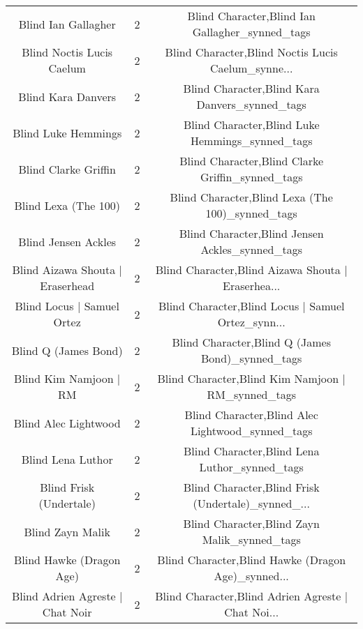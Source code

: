 \begin{table}[h!]
{\begin{tabular}{|c|c|c|}
                               Blind Ian Gallagher &          2 &    Blind Character,Blind Ian Gallagher\_synned\_tags \\
                         Blind Noctis Lucis Caelum &          2 & Blind Character,Blind Noctis Lucis Caelum\_synne... \\
                                Blind Kara Danvers &          2 &     Blind Character,Blind Kara Danvers\_synned\_tags \\
                               Blind Luke Hemmings &          2 &    Blind Character,Blind Luke Hemmings\_synned\_tags \\
                              Blind Clarke Griffin &          2 &   Blind Character,Blind Clarke Griffin\_synned\_tags \\
                              Blind Lexa (The 100) &          2 &   Blind Character,Blind Lexa (The 100)\_synned\_tags \\
                               Blind Jensen Ackles &          2 &    Blind Character,Blind Jensen Ackles\_synned\_tags \\
                  Blind Aizawa Shouta | Eraserhead &          2 & Blind Character,Blind Aizawa Shouta | Eraserhea... \\
                        Blind Locus | Samuel Ortez &          2 & Blind Character,Blind Locus | Samuel Ortez\_synn... \\
                              Blind Q (James Bond) &          2 &   Blind Character,Blind Q (James Bond)\_synned\_tags \\
                            Blind Kim Namjoon | RM &          2 & Blind Character,Blind Kim Namjoon | RM\_synned\_tags \\
                              Blind Alec Lightwood &          2 &   Blind Character,Blind Alec Lightwood\_synned\_tags \\
                                 Blind Lena Luthor &          2 &      Blind Character,Blind Lena Luthor\_synned\_tags \\
                           Blind Frisk (Undertale) &          2 & Blind Character,Blind Frisk (Undertale)\_synned\_... \\
                                  Blind Zayn Malik &          2 &       Blind Character,Blind Zayn Malik\_synned\_tags \\
                          Blind Hawke (Dragon Age) &          2 & Blind Character,Blind Hawke (Dragon Age)\_synned... \\
                  Blind Adrien Agreste | Chat Noir &          2 & Blind Character,Blind Adrien Agreste | Chat Noi... \\

\end{tabular}}
\end{table}
